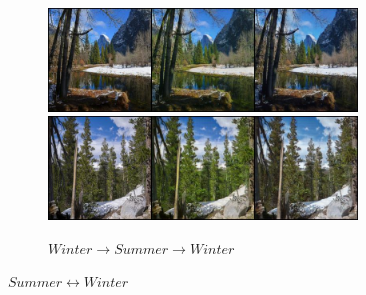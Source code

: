 \documentclass[10pt,twocolumn,letterpaper]{article}
\begin{document}
\begin{figure}[!htb]
\begin{subfigure}[]{0.49\textwidth}
         \vspace{0.3cm}
		 \includegraphics[width=0.9\textwidth]{test_b_2_a_168}\\
		 \vspace{0.3cm}
		 \includegraphics[width=0.9\textwidth]{test_b_2_a_211}
		 \caption{$Winter \rightarrow Summer \rightarrow Winter$}
         \label{fig:winter2summer}
     \end{subfigure}

     \caption{$Summer \leftrightarrow Winter$}
     \label{fig:summer22winter}
\end{figure} 
\end{document}
